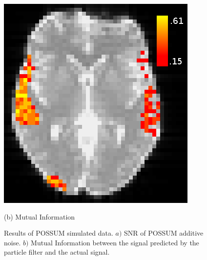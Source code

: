 \documentclass{article}
\begin{document}
\begin{figure}[htb]
\begin{minipage}[b]{.49\linewidth}
  \centerline{\includegraphics[width=\textwidth]{sim_hm_mi.png}}
  \centerline{(b) Mutual Information}\medskip
\end{minipage}
\caption{Results of POSSUM simulated data. $a)$ 
SNR of POSSUM additive noise. $b)$ Mutual Information between
the signal predicted by the particle filter and the actual signal.}
\label{fig:PossumResult}
\end{figure}
\end{document}
